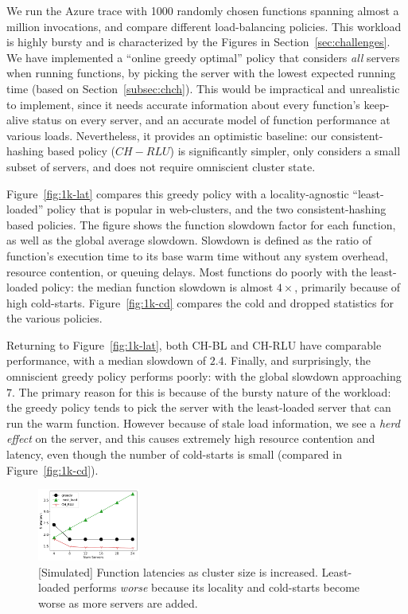 We run the Azure trace with 1000 randomly chosen functions spanning almost a million invocations, and compare different load-balancing policies.
This workload is highly bursty and is characterized by the Figures in Section~\ref{sec:challenges}. 
We have implemented a ``online greedy optimal'' policy that considers \emph{all} servers when running functions, by picking the server with the lowest expected running time (based on Section~\ref{subsec:chch}).
This would be impractical and unrealistic to implement, since it needs accurate information about every function's keep-alive status on every server, and an accurate model of function performance at various loads.
Nevertheless, it provides an optimistic baseline: our consistent-hashing based policy ($CH-RLU$) is significantly simpler, only considers a small subset of servers, and does not require omniscient cluster state. 

Figure~\ref{fig:1k-lat} compares this greedy policy with a locality-agnostic ``least-loaded'' policy that is popular in web-clusters, and the two consistent-hashing based policies. 
The figure shows the function slowdown factor for each function, as well as the global average slowdown.
Slowdown is defined as the ratio of function's execution time to its base warm time without any system overhead, resource contention, or queuing delays.
Most functions do poorly with the least-loaded policy: the median function slowdown is almost $4\times$, primarily because of high cold-starts.
Figure~\ref{fig:1k-cd} compares the cold and dropped statistics for the various policies.

Returning to Figure~\ref{fig:1k-lat}, both CH-BL and CH-RLU have comparable performance, with a median slowdown of $2.4$. 
Finally, and surprisingly, the omniscient greedy policy performs poorly: with the global slowdown approaching $7$.
The primary reason for this is because of the bursty nature of the workload: the greedy policy tends to pick the server with the least-loaded server that can run the warm function.
However because of stale load information, we see a \emph{herd effect} on the server, and this causes extremely high resource contention and latency, even though the number of cold-starts is small (compared in Figure~\ref{fig:1k-cd}). 


\begin{figure}
  \centering
  \includegraphics[width=0.3\textwidth]{chrlu/faaslb-osdi22/figs/1k/latencies-250scaling.pdf}
  \caption{[Simulated] Function latencies as cluster size is increased. Least-loaded performs \emph{worse} because its locality and cold-starts become worse as more servers are added.}
  \label{fig:1k-scaling}
\end{figure}

